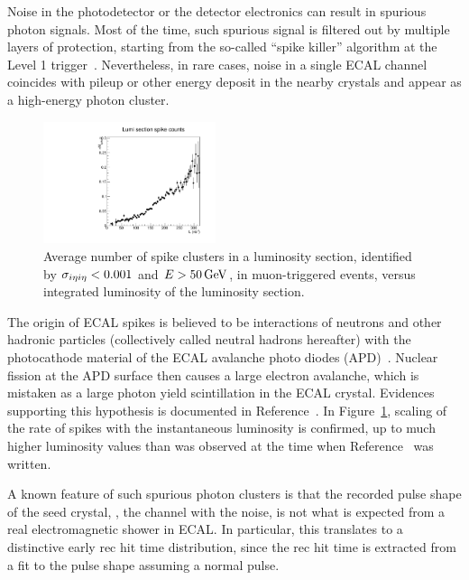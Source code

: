 Noise in the photodetector or the detector electronics can result in spurious photon signals. 
Most of the time, such spurious signal is filtered out by multiple layers of protection, starting from the so-called ``spike killer'' algorithm at the Level 1 trigger~\cite{CMS_AN_2010-357}. 
Nevertheless, in rare cases, noise in a single ECAL channel coincides with pileup or other energy deposit in the nearby crystals and appear as a high-energy photon cluster.

\begin{figure}[tbp]
  \centering
  \includegraphics[width=0.45\textwidth]{Reconstruction/Figures/spikes/spike_lumi_scaling.pdf}
  \caption{
    Average number of spike clusters in a luminosity section, identified by $\sigma_{i\eta i\eta} < 0.001$ and $E > 50\,\text{Ge\hspace{-.08em}V}$, in muon-triggered events, versus integrated luminosity of the luminosity section.
  }
  \label{fig:spike_lumi_scaling}
\end{figure}

The origin of ECAL spikes is believed to be interactions of neutrons and other hadronic particles (collectively called neutral hadrons hereafter) with the photocathode material of the ECAL avalanche photo diodes (APD)~\cite{Spike2012}. 
Nuclear fission at the APD surface then causes a large electron avalanche, which is mistaken as a large photon yield scintillation in the ECAL crystal. 
Evidences supporting this hypothesis is documented in Reference~\cite{CMS_AN_2010-357}. 
In Figure~\ref{fig:spike_lumi_scaling}, scaling of the rate of spikes with the instantaneous luminosity is confirmed, up to much higher luminosity values than was observed at the time when Reference~\cite{CMS_AN_2010-357} was written.

A known feature of such spurious photon clusters is that the recorded pulse shape of the seed crystal, \ie, the channel with the noise, is not what is expected from a real electromagnetic shower in ECAL. 
In particular, this translates to a distinctive early rec hit time distribution, since the rec hit time is extracted from a fit to the pulse shape assuming a normal pulse.

